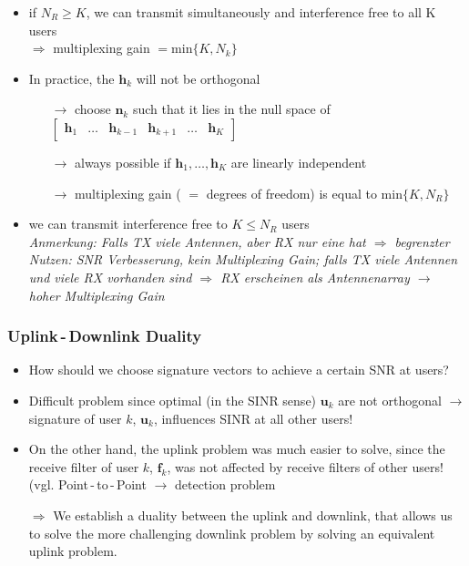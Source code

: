 \documentclass[a4paper, 10pt]{article}
\begin{document}
\begin{itemize}
	\item if $N_R \geq K$, we can transmit simultaneously and interference free to all K users\\ $\Rightarrow $ multiplexing gain $= \text{min}\{K,N_k\} $
\item In practice, the $\mathbf{h}_k $ will not be orthogonal
\begin{itemize}
	\item[$\rightarrow$] choose $\mathbf{n}_k $ such that it lies in the null space of $\begin{bmatrix}
	\mathbf{h}_1 & \ldots & \mathbf{h}_{k-1} & \mathbf{h}_{k+1} & \ldots & \mathbf{h}_K \end{bmatrix}	 $
	\item[$\rightarrow$] always possible if $ \mathbf{h}_1,\ldots, \mathbf{h}_K $ are linearly independent
	\item[$\rightarrow$] multiplexing gain ( $= $ degrees of freedom) is equal to $ \text{min}\{K, N_R\} $
\end{itemize}
\item we can transmit interference free to $K\leq N_R $ users \\ \quad \textit{Anmerkung: Falls TX viele Antennen, aber RX nur eine hat $\Rightarrow $ begrenzter Nutzen: SNR Verbesserung, kein Multiplexing Gain; falls TX viele Antennen und viele RX vorhanden sind $\Rightarrow $ RX erscheinen als Antennenarray $\rightarrow $ hoher Multiplexing Gain}
\end{itemize}

\subsubsection{Uplink\,-\,Downlink  Duality}
\begin{itemize}
	\item How should we choose signature vectors to achieve a certain SNR at users?
	\item Difficult problem since optimal (in the SINR sense) $\mathbf{u}_k $ are not orthogonal $\rightarrow $ signature of user $k$, $\mathbf{u}_k $, influences SINR at all other users!
	\item On the other hand, the uplink problem was much easier to solve, since the receive filter of user $k$, $\mathbf{f}_k$, was not affected by receive filters of other users! (vgl. Point\,-\,to\,-\,Point $\rightarrow $ detection problem
	\item[$\Rightarrow$] We establish a duality between the uplink and downlink, that allows us to solve the more challenging downlink problem by solving an equivalent uplink problem.
\end{itemize}
\end{document}
